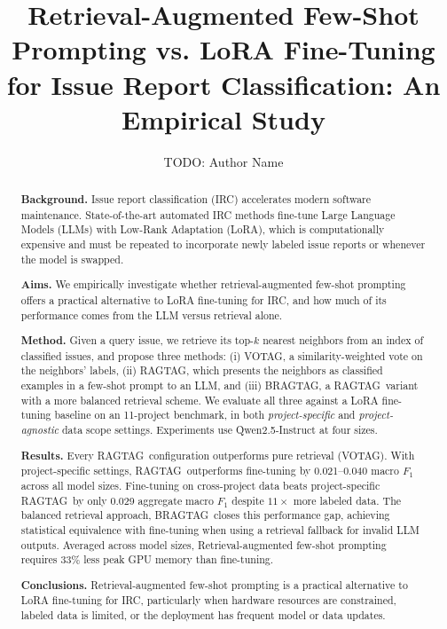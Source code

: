 \documentclass[a4paper,UKenglish,cleveref,autoref,thm-restate,anonymous]{lipics-v2021}
\title{Retrieval-Augmented Few-Shot Prompting vs. LoRA Fine-Tuning for Issue Report Classification: An Empirical Study}
\author{TODO: Author Name}{Affiliation, City, Country}{email@domain}{https://orcid.org/0000-0000-0000-0000}{}
\newcommand{\votag}{VOTAG\xspace}
\newcommand{\ragtag}{RAGTAG\xspace}
\newcommand{\bragtag}{BRAGTAG\xspace}
\begin{document}
\maketitle

\begin{abstract}
\textbf{Background.} Issue report classification (IRC) accelerates modern software maintenance. State-of-the-art automated IRC methods fine-tune Large Language Models (LLMs) with Low-Rank Adaptation (LoRA), which is computationally expensive and must be repeated to incorporate newly labeled issue reports or whenever the model is swapped.

\textbf{Aims.} We empirically investigate whether retrieval-augmented few-shot prompting offers a practical alternative to LoRA fine-tuning for IRC, and how much of its performance comes from the LLM versus retrieval alone.

\textbf{Method.} Given a query issue, we retrieve its top-$k$ nearest neighbors from an index of classified issues, and propose three methods: (i) \votag, a similarity-weighted vote on the neighbors' labels, (ii) \ragtag, which presents the neighbors as classified examples in a few-shot prompt to an LLM, and (iii) \bragtag, a \ragtag\ variant with a more balanced retrieval scheme. We evaluate all three against a LoRA fine-tuning baseline on an 11-project benchmark, in both \emph{project-specific} and \emph{project-agnostic} data scope settings. Experiments use Qwen2.5-Instruct at four sizes.


\textbf{Results.} Every \ragtag\ configuration outperforms pure retrieval (\votag). With project-specific settings, \ragtag\ outperforms fine-tuning by 0.021--0.040 macro $F_1$ across all model sizes. Fine-tuning on cross-project data beats project-specific \ragtag\ by only 0.029 aggregate macro $F_1$ despite $11\times$ more labeled data. The balanced retrieval approach, \bragtag\, closes this performance gap, achieving statistical equivalence with fine-tuning when using a retrieval fallback for invalid LLM outputs. Averaged across model sizes, Retrieval-augmented few-shot prompting requires 33\% less peak GPU memory than fine-tuning.

\textbf{Conclusions.} Retrieval-augmented few-shot prompting is a practical alternative to LoRA fine-tuning for IRC, particularly when hardware resources are constrained, labeled data is limited, or the deployment has frequent model or data updates.
\end{abstract}












\end{document}
